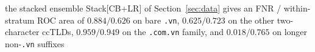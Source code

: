 the stacked ensemble Stack[CB+LR] of Section~\ref{sec:data} gives an FNR / within-stratum ROC area of $0.884/0.626$ on bare \texttt{.vn}, $0.625/0.723$ on the other two-character ccTLDs, $0.959/0.949$ on the \texttt{.com.vn} family, and $0.018/0.765$ on longer non-\texttt{.vn} suffixes%
